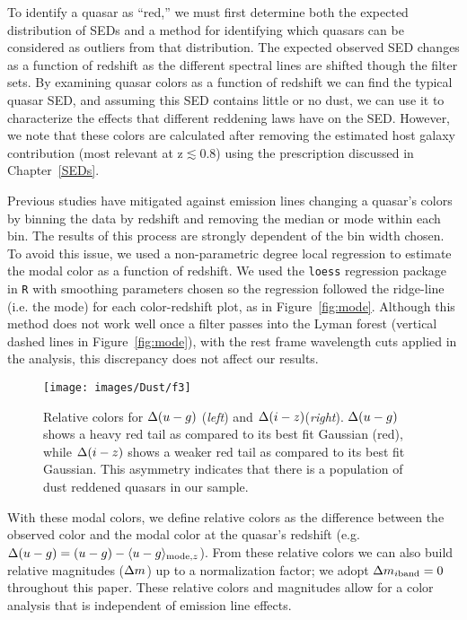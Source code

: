 To identify a quasar as ``red,'' we must first determine both
the expected distribution of SEDs and a method for identifying which
quasars can be considered as outliers from that distribution.
The expected observed SED changes as a function of redshift as the different spectral lines are shifted though the filter sets.  By examining quasar colors as a function of redshift we can find the typical quasar SED, and assuming this SED contains little or no dust, we can use it to characterize the effects that different reddening laws have on the SED. However, we note that these colors are calculated after removing the estimated host galaxy contribution (most relevant at z$\lesssim$0.8) using the prescription discussed in Chapter~\ref{SEDs}.

Previous studies have mitigated against emission lines changing a quasar's colors by binning the data by redshift and removing the median \citep[e.g.,][]{Richards:2003} or mode \citep[e.g.,][]{Hopkins:2004} within each bin. The results of this process are strongly dependent of the bin width chosen.  To avoid this issue, we used a non-parametric  degree local regression to estimate the modal color as a function of redshift.  We used the \texttt{loess} regression package in \texttt{R} with smoothing parameters chosen so the regression followed the ridge-line (i.e. the mode) for each color-redshift plot, as in Figure~\ref{fig:mode}.  Although this method does not work well once a filter passes into the Lyman forest 
(vertical dashed lines in Figure~\ref{fig:mode}), with the rest frame wavelength cuts applied in the analysis, this discrepancy does not affect our results.

\begin{figure*}%
\begin{center}
\texttt{[image: images/Dust/f3]}
\caption[Relative colors]{\label{fig:Dug} 
Relative colors for $\Delta(u-g)$ ({\em left}) and $\Delta(i-z)$({\em right}). $\Delta(u-g)$ shows a heavy red tail as compared to its best fit Gaussian (red), while $\Delta(i-z)$ shows a weaker red tail as compared to its best fit Gaussian. This asymmetry indicates that there is a population of dust reddened quasars in our sample.}
\end{center}
\end{figure*}

With these modal colors, we define relative colors \citep{Richards:2003} as the difference between the observed color and the modal color at the quasar's redshift (e.g. $\Delta(u-g)=(u-g)-\langle u-g \rangle_{{\rm mode},z}$).  From these relative colors we can also build relative magnitudes ($\Delta m$) up to a normalization factor; we adopt $\Delta m_{i{\rm band}}=0$ throughout this paper.  These relative colors and magnitudes allow for a color analysis that is independent of emission line effects.

